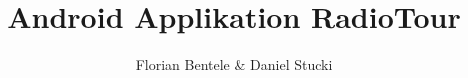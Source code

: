 \setlength{\oddsidemargin}{35mm}
	
\title{Android Applikation RadioTour}
\author{Florian Bentele \& Daniel Stucki}


\newcommand{\thesis}{Studienarbeit}
\newcommand{\departement}{Abteilung Informatik}
\newcommand{\school}{Hochschule für Technik Rapperswil}
\newcommand{\term}{Frühjahrssemester 2012}
\newcommand{\thedate}{01. Juni 2012}
\newcommand{\timeperiode}{21.02.2012 - 01.06.2012}
\newcommand{\partner}{Lukas Frey, cnlab AG, Rapperswil-Jona}
\newcommand{\workload}{240 Arbeitsstunden bzw. 8 ECTS pro Student}
\newcommand{\linktothesis}{https://github.com/dstucki/RadioTour}
\newcommand{\professor}{Prof. Dr. Peter Heinzmann}


\maketitle
